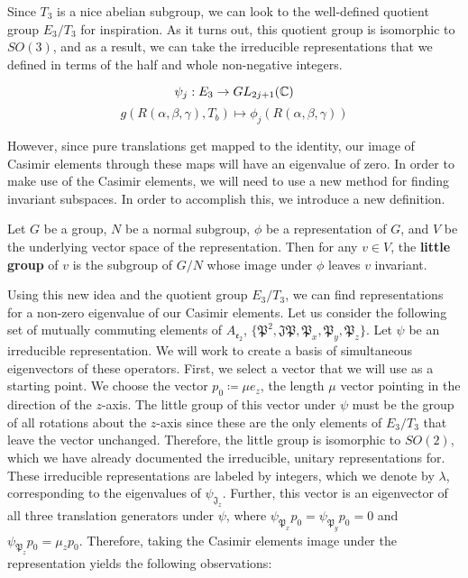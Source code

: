 Since $T_3$ is a nice abelian subgroup, we can look to the well-defined quotient group $E_3/T_3$ for inspiration. As it turns out, this quotient group is isomorphic to $SO(3)$, and as a result, we can take the irreducible representations that we defined in terms of the half and whole non-negative integers.

$$\psi_j: E_3 \rightarrow GL_{2j+1}(\mathbb{C})$$
$$g(R(\alpha,\beta,\gamma), T_b) \mapsto \phi_j(R(\alpha,\beta,\gamma))$$

However, since pure translations get mapped to the identity, our image of Casimir elements through these maps will have an eigenvalue of zero. In order to make use of the Casimir elements, we will need to use a new method for finding invariant subspaces. In order to accomplish this, we introduce a new definition.

\begin{definition}
	Let $G$ be a group, $N$ be a normal subgroup, $\phi$ be a representation of $G$, and $V$ be the underlying vector space of the representation. Then for any $v\in V$, the \textbf{little group} of $v$ is the subgroup of $G/N$ whose image under $\phi$ leaves $v$ invariant.
\end{definition}

Using this new idea and the quotient group $E_3/T_3$, we can find representations for a non-zero eigenvalue of our Casimir elements. Let us consider the following set of mutually commuting elements of $A_\mathfrak{e_2}$, $\{\mathfrak{P^2},\mathfrak{JP},\mathfrak{P}_x,\mathfrak{P}_y,\mathfrak{P}_z\}$. Let $\psi$ be an irreducible representation. We will work to create a basis of simultaneous eigenvectors of these operators. First, we select a vector that we will use as a starting point. We choose the vector $p_0 \coloneq \mu e_z$, the length $\mu$ vector pointing in the direction of the $z$-axis. The little group of this vector under $\psi$ must be the group of all rotations about the $z$-axis since these are the only elements of $E_3/T_3$ that leave the vector unchanged. Therefore, the little group is isomorphic to $SO(2)$, which we have already documented the irreducible, unitary representations for. These irreducible representations are labeled by integers, which we denote by $\lambda$, corresponding to the eigenvalues of $\psi_{\mathfrak{J}_z}$. Further, this vector is an eigenvector of all three translation generators under $\psi$, where $\psi_{\mathfrak{P}_x}p_0 = \psi_{\mathfrak{P}_y}p_0 = 0$ and $\psi_{\mathfrak{P}_z}p_0 = \mu_z p_0$. Therefore, taking the Casimir elements image under the representation yields the following observations:

